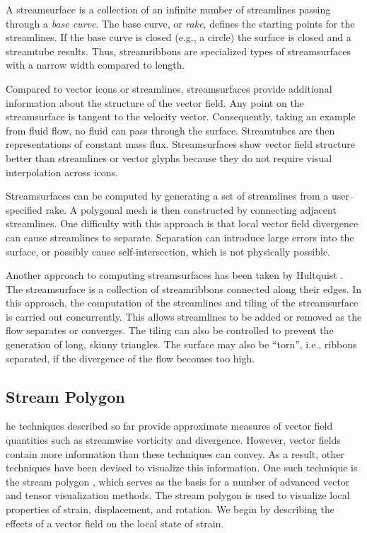 A streamsurface is a collection of an infinite number of streamlines passing through a \emph{base curve}. The base curve, or \emph{rake}, defines the starting points for the streamlines. If the base curve is closed (e.g., a circle) the surface is closed and a streamtube results. Thus, streamribbons are specialized types of streamsurfaces with a narrow width compared to length.

Compared to vector icons or streamlines, streamsurfaces provide additional information about the structure of the vector field. Any point on the streamsurface is tangent to the velocity vector. Consequently, taking an example from fluid flow, no fluid can pass through the surface. Streamtubes are then representations of constant mass flux. Streamsurfaces show vector field structure better than streamlines or vector glyphs because they do not require visual interpolation across icons.

Streamsurfaces can be computed by generating a set of streamlines from a user--specified rake. A polygonal mesh is then constructed by connecting adjacent streamlines. One difficulty with this approach is that local vector field divergence can cause streamlines to separate. Separation can introduce large errors into the surface, or possibly cause self-intersection, which is not physically possible.

Another approach to computing streamsurfaces has been taken by Hultquist \cite{Hultquist92}. The streamsurface is a collection of streamribbons connected along their edges. In this approach, the computation of the streamlines and tiling of the streamsurface is carried out concurrently. This allows streamlines to be added or removed as the flow separates or converges. The tiling can also be controlled to prevent the generation of long, skinny triangles. The surface may also be ``torn'', i.e., ribbons separated, if the divergence of the flow becomes too high.

\subsection{Stream Polygon}

he techniques described so far provide approximate measures of vector field quantities such as streamwise vorticity and divergence. However, vector fields contain more information than these techniques can convey. As a result, other techniques have been devised to visualize this information. One such technique is the stream polygon \cite{Schroeder91}, which serves as the basis for a number of advanced vector and tensor visualization methods. The stream polygon is used to visualize local properties of strain, displacement, and rotation. We begin by describing the effects of a vector field on the local state of strain.

